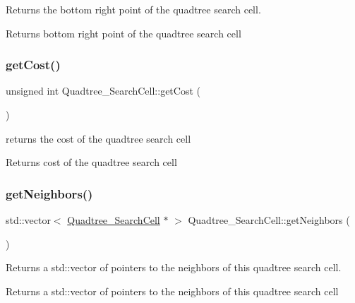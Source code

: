 Returns the bottom right point of the quadtree search cell. 

\begin{DoxyReturn}{Returns}
bottom right point of the quadtree search cell 
\end{DoxyReturn}
\mbox{\label{classQuadtree__SearchCell_af5398942f7a48fc146ec99f798aedc71}} 
\subsubsection{\texorpdfstring{get\+Cost()}{getCost()}}
{\footnotesize\ttfamily unsigned int Quadtree\+\_\+\+Search\+Cell\+::get\+Cost (\begin{DoxyParamCaption}{ }\end{DoxyParamCaption})}



returns the cost of the quadtree search cell 

\begin{DoxyReturn}{Returns}
cost of the quadtree search cell 
\end{DoxyReturn}
\mbox{\label{classQuadtree__SearchCell_a8af6b597f8a32c7c19f858f34d16efa2}} 
\subsubsection{\texorpdfstring{get\+Neighbors()}{getNeighbors()}}
{\footnotesize\ttfamily std\+::vector$<$ \hyperlink{classQuadtree__SearchCell}{Quadtree\+\_\+\+Search\+Cell} $\ast$ $>$ Quadtree\+\_\+\+Search\+Cell\+::get\+Neighbors (\begin{DoxyParamCaption}{ }\end{DoxyParamCaption})}



Returns a std\+::vector of pointers to the neighbors of this quadtree search cell. 

\begin{DoxyReturn}{Returns}
a std\+::vector of pointers to the neighbors of this quadtree search cell 
\end{DoxyReturn}
\mbox{\label{classQuadtree__SearchCell_a757563b6c0b2c46ab3470225fc3d9026}} 
